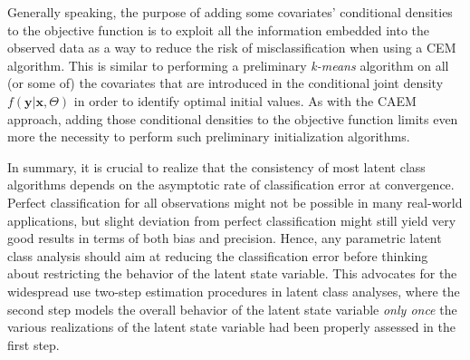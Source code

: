 \documentclass[11pt,letter]{article}
\begin{document}
\par\textit{}
Generally speaking, the purpose of adding some covariates' conditional densities to the objective function is to exploit all the information embedded into the observed data as a way to reduce the risk of misclassification when using a CEM algorithm. This is similar to performing a preliminary \textit{k-means} algorithm on all (or some of) the covariates that are introduced in the conditional joint density $f(\mathbf{y}|\mathbf{x},\Theta)$ in order to identify optimal initial values. As with the CAEM approach, adding those conditional densities to the objective function limits even more the necessity to perform such preliminary initialization algorithms.
\par
In summary, it is crucial to realize that the consistency of most latent class algorithms depends on the asymptotic rate of classification error at convergence. Perfect classification for all observations might not be possible in many real-world applications, but slight deviation from perfect classification might still yield very good results in terms of both bias and precision. Hence, any parametric latent class analysis should aim at reducing the classification error before thinking about restricting the behavior of the latent state variable. This advocates for the widespread use two-step estimation procedures in latent class analyses, where the second step models the overall behavior of the latent state variable \textit{only once} the various realizations of the latent state variable had been properly assessed in the first step.
\end{document}
